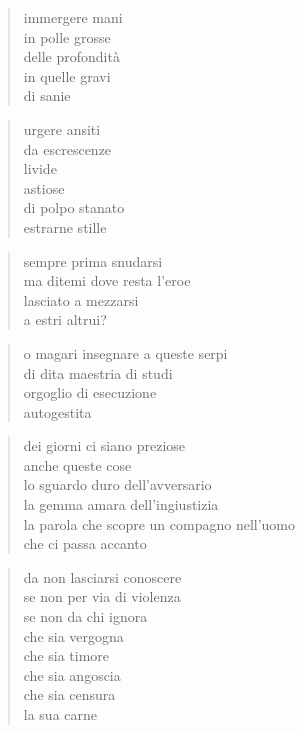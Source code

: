 \clearpage



	\begin{verse}
		immergere mani\\
		in polle grosse\\
		delle profondità\\
		in quelle gravi\\
		di sanie
	\end{verse}

	\begin{verse}
		urgere ansiti\\
		da escrescenze\\
		livide\\
		astiose\\
		di polpo stanato\\
		estrarne stille
	\end{verse}

	\begin{verse}
		sempre prima snudarsi\\
		ma ditemi dove resta l’eroe\\
		lasciato a mezzarsi\\
		a estri altrui?
	\end{verse}

	\begin{verse}
		o magari insegnare a queste serpi\\
		di dita maestria di studi\\
		orgoglio di esecuzione\\
		autogestita
	\end{verse}

\clearpage



	\begin{verse}
                dei giorni ci siano preziose\\
                anche queste cose\\
                lo sguardo duro dell’avversario\\
                la gemma amara dell’ingiustizia\\
                la parola che scopre un compagno nell’uomo\\
                che ci passa accanto
	\end{verse}

\clearpage



	\begin{verse}
		da non lasciarsi conoscere\\
		se non per via di violenza\\
		se non da chi ignora\\
		che sia vergogna\\
		che sia timore\\
		che sia angoscia\\
		che sia censura\\
		la sua carne
	\end{verse}

